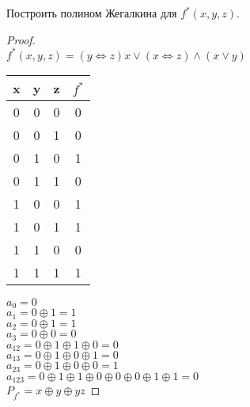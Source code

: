 \begin{problem}
Построить полином Жегалкина для $f^*(x, y, z)$.
\end{problem}
\begin{proof} $ $\\
    $f^*(x, y, z) = (y \Leftrightarrow z)x \vee (x \Leftrightarrow z) \wedge (x \vee y)$\\
    \begin{table}[H]
    \begin{center}
    \begin{tabular}{|c|c|c|c|}
    \hline
    x & y & z & $f^*$\\
    \hline
    0 & 0 & 0    & 0\\
    0 & 0 & 1    & 0\\
    0 & 1 & 0    & 1\\
    0 & 1 & 1    & 0\\
    1 & 0 & 0    & 1\\
    1 & 0 & 1    & 1\\
    1 & 1 & 0    & 0\\
    1 & 1 & 1    & 1\\
    \hline
    \end{tabular}
    \end{center}
    \end{table} $ $\\
    $a_0 = 0$\\
    $a_1 = 0 \oplus 1 = 1$\\
    $a_2 = 0 \oplus 1 = 1$\\
    $a_3 = 0 \oplus 0 = 0$\\
    $a_{12} = 0 \oplus 1 \oplus 1 \oplus 0 = 0$\\
    $a_{13} = 0 \oplus 1 \oplus 0 \oplus 1 = 0$\\
    $a_{23} = 0 \oplus 1 \oplus 0 \oplus 0 = 1$\\
    $a_{123} = 0 \oplus 1 \oplus 1 \oplus 0 \oplus 0 \oplus 0 \oplus 1 \oplus 1 = 0$\\
    $P_{f^*} = x \oplus y \oplus yz$
\end{proof}

